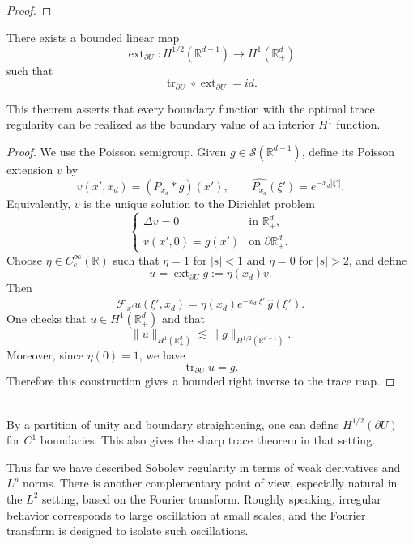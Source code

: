 \begin{proof}

\end{proof}

\begin{theorem}
There exists a bounded linear map
\[
\operatorname{ext}_{\partial U}: H^{1/2}(\mathbb{R}^{d-1}) \to H^1(\mathbb{R}_+^d)
\]
such that
\[
\operatorname{tr}_{\partial U}\circ \operatorname{ext}_{\partial U} = id.
\]
\end{theorem}

\begin{remark}
This theorem asserts that every boundary function with the optimal trace regularity can be realized as the boundary value of an interior $H^1$ function.
\end{remark}

\begin{proof}
We use the Poisson semigroup. Given $g\in \mathcal{S}(\mathbb{R}^{d-1})$, define its Poisson extension $v$ by
\[
v(x',x_d) = (P_{x_d} * g)(x'), \qquad \widehat{P_{x_d}}(\xi') = e^{-x_d|\xi'|}.
\]
Equivalently, $v$ is the unique solution to the Dirichlet problem
\[
\begin{cases}
\Delta v = 0 & \text{in }\mathbb{R}_+^d,\\
v(x',0)=g(x') & \text{on }\partial \mathbb{R}_+^d.
\end{cases}
\]
Choose $\eta\in C_c^{\infty}(\mathbb{R})$ such that $\eta=1$ for $|s|<1$ and $\eta=0$ for $|s|>2$, and define
\[
u = \operatorname{ext}_{\partial U}g := \eta(x_d)v.
\]
Then
\[
\mathcal{F}_{x'}u(\xi',x_d) = \eta(x_d)e^{-x_d|\xi'|}\hat{g}(\xi').
\]
One checks that $u\in H^1(\mathbb{R}_+^d)$ and that
\[
\|u\|_{H^1(\mathbb{R}_+^d)} \lesssim \|g\|_{H^{1/2}(\mathbb{R}^{d-1})}.
\]
Moreover, since $\eta(0)=1$, we have
\[
\operatorname{tr}_{\partial U}u = g.
\]
Therefore this construction gives a bounded right inverse to the trace map.
\end{proof}

\begin{remark}
\leavevmode\\
By a partition of unity and boundary straightening, one can define $H^{1/2}(\partial U)$ for $C^1$ boundaries. This also gives the sharp trace theorem in that setting.
\end{remark}

Thus far we have described Sobolev regularity in terms of weak derivatives and $L^p$ norms. There is another complementary point of view, especially natural in the $L^2$ setting, based on the Fourier transform. Roughly speaking, irregular behavior corresponds to large oscillation at small scales, and the Fourier transform is designed to isolate such oscillations.

